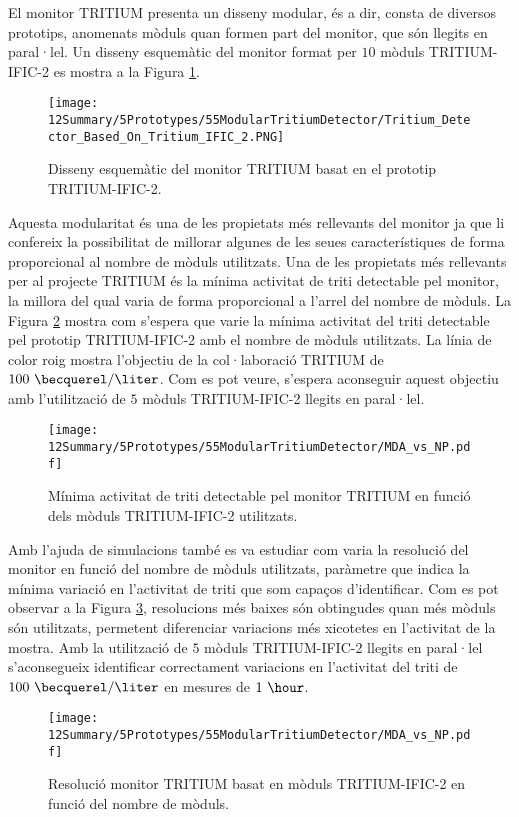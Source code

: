 El monitor TRITIUM presenta un disseny modular, és a dir, consta de diversos prototips, anomenats mòduls quan formen part del monitor, que són llegits en paral·lel. Un disseny esquemàtic del monitor format per $10$ mòduls TRITIUM-IFIC-2 es mostra a la Figura \ref{fig:10TritiumMonitorIFIC2}.

\begin{figure}[h]
\centering
\texttt{[image: 12Summary/5Prototypes/55ModularTritiumDetector/Tritium\_Detector\_Based\_On\_Tritium\_IFIC\_2.PNG]}
\caption{Disseny esquemàtic del monitor TRITIUM basat en el prototip TRITIUM-IFIC-2.\label{fig:10TritiumMonitorIFIC2}}
\end{figure}

Aquesta modularitat és una de les propietats més rellevants del monitor ja que li confereix la possibilitat de millorar algunes de les seues característiques de forma proporcional al nombre de mòduls utilitzats. Una de les propietats més rellevants per al projecte TRITIUM és la mínima activitat de triti detectable pel monitor, la millora del qual varia de forma proporcional a l'arrel del nombre de mòduls. La Figura \ref{fig:MDATritiumMonitorIFIC2} mostra com s'espera que varie la mínima activitat del triti detectable pel prototip TRITIUM-IFIC-2 amb el nombre de mòduls utilitzats. La línia de color roig mostra l'objectiu de la col·laboració TRITIUM de $100~\becquerel/\liter$. Com es pot veure, s'espera aconseguir aquest objectiu amb l'utilització de $5$ mòduls TRITIUM-IFIC-2 llegits en paral·lel.

\begin{figure}[h]
\centering
\texttt{[image: 12Summary/5Prototypes/55ModularTritiumDetector/MDA\_vs\_NP.pdf]}
\caption{Mínima activitat de triti detectable pel monitor TRITIUM en funció dels mòduls TRITIUM-IFIC-2 utilitzats.\label{fig:MDATritiumMonitorIFIC2}}
\end{figure}

Amb l'ajuda de simulacions també es va estudiar com varia la resolució del monitor en funció del nombre de mòduls utilitzats, paràmetre que indica la mínima variació en l'activitat de triti que som capaços d'identificar. Com es pot observar a la Figura \ref{fig:ResolucioTritiumMonitorIFIC2},  resolucions més baixes són obtingudes quan més mòduls són utilitzats, permetent diferenciar variacions més xicotetes en l'activitat de la mostra. Amb la utilització de $5$ mòduls TRITIUM-IFIC-2 llegits en paral·lel s'aconsegueix identificar correctament variacions en l'activitat del triti de $100~\becquerel/\liter$ en mesures de $1~\hour$.

\begin{figure}[h]
\centering
\texttt{[image: 12Summary/5Prototypes/55ModularTritiumDetector/MDA\_vs\_NP.pdf]}
\caption{Resolució monitor TRITIUM basat en mòduls TRITIUM-IFIC-2 en funció del nombre de mòduls.\label{fig:ResolucioTritiumMonitorIFIC2}}
\end{figure}